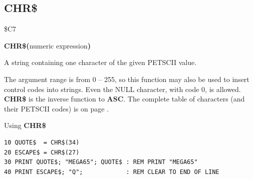 
\newpage
{}
\subsection{CHR\$}
\label{BASIC 65 Functions!CHR}
\begin{description}[leftmargin=2cm,style=nextline]
\item [Token:]   \$C7

\item [Format:]  {\bf CHR\$(}numeric expression{\bf)}

\item [Returns:] A string containing one character of the given PETSCII value.

\item [Remarks:] The argument range is from 0 -- 255, so this function may also be used to insert control codes into strings.
                 Even the NULL character, with code 0, is allowed. {\bf CHR\$} is the inverse function to {\bf ASC}. The complete table of characters (and their PETSCII codes) is on page \pageref{appendix:petsciicodes}.

\item [Example:] Using {\bf CHR\$}

\begin{tcolorbox}[colback=black,coltext=white]
\verbatimfont{\codefont}
\begin{verbatim}
10 QUOTE$  = CHR$(34)
20 ESCAPE$ = CHR$(27)
30 PRINT QUOTE$; "MEGA65"; QUOTE$ : REM PRINT "MEGA65"
40 PRINT ESCAPE$; "Q";            : REM CLEAR TO END OF LINE
\end{verbatim}
\end{tcolorbox}
\end{description}


\newpage
